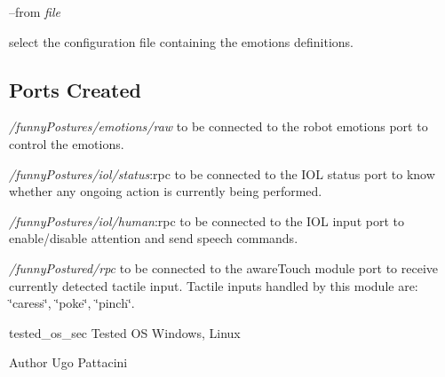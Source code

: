 --from {\itshape file} 
\begin{DoxyItemize}
\item select the configuration file containing the emotions definitions.
\end{DoxyItemize}\hypertarget{group__icub__iCubWriter_portsc_sec}{}\subsection{Ports Created}\label{group__icub__iCubWriter_portsc_sec}
{\itshape /funny\+Postures/emotions/raw} to be connected to the robot emotions port to control the emotions.

{\itshape /funny\+Postures/iol/status}\+:rpc to be connected to the I\+OL status port to know whether any ongoing action is currently being performed.

{\itshape /funny\+Postures/iol/human}\+:rpc to be connected to the I\+OL input port to enable/disable attention and send speech commands.

{\itshape /funny\+Postured/rpc} to be connected to the aware\+Touch module port to receive currently detected tactile input. Tactile inputs handled by this module are\+: \char`\"{}caress\char`\"{}, \char`\"{}poke\char`\"{}, \char`\"{}pinch\char`\"{}.

tested\+\_\+os\+\_\+sec Tested OS Windows, Linux

\begin{DoxyAuthor}{Author}
Ugo Pattacini 
\end{DoxyAuthor}
